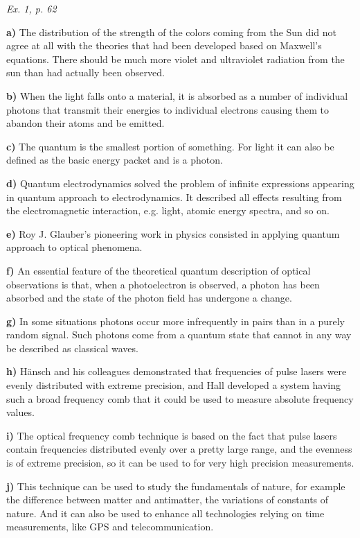\documentclass[a4paper, 12pt]{article}
\def\task#1{\begin{center}\it #1\end{center}}
\newif\ifcols
\begin{document}
\task{Ex. 1, p. 62}
\ifcols\begin{multicols}{2}\fi%

\textbf{a)} The distribution of the strength of the colors coming from the Sun did not agree at all with the theories that had been developed based on Maxwell’s equations. There should be much more violet and ultraviolet radiation from the sun than had actually been observed.

\textbf{b)} When the light falls onto a material, it is absorbed as a number of individual photons that transmit their energies to individual electrons causing them to abandon their atoms and be emitted.

\textbf{c)} The quantum is the smallest portion of something. For light it can also be defined as the basic energy packet and is a photon.

\textbf{d)} Quantum electrodynamics solved the problem of infinite expressions appearing in quantum approach to electrodynamics. It described all effects resulting from the electromagnetic interaction, e.g. light, atomic energy spectra, and so on.

\textbf{e)} Roy J. Glauber's pioneering work in physics consisted in applying quantum approach to optical phenomena.

\textbf{f)} An essential feature of the theoretical quantum description of optical observations is that, when a photoelectron is observed, a photon has been absorbed and the state of the photon field has undergone a change.

\textbf{g)} In some situations photons occur more infrequently in pairs than in a purely random signal. Such photons come from a quantum state that cannot in any way be described as classical waves.

\textbf{h)} H\"ansch and his colleagues demonstrated that frequencies of pulse lasers were evenly distributed with extreme precision, and Hall developed a system having such a broad frequency comb that it could be used to measure absolute frequency values.

\textbf{i)} The optical frequency comb technique is based on the fact that pulse lasers contain frequencies distributed evenly over a pretty large range, and the evenness is of extreme precision, so it can be used to for very high precision measurements.

\textbf{j)} This technique can be used to study the fundamentals of nature, for example the difference between matter and antimatter, the variations of constants of nature. And it can also be used to enhance all technologies relying on time measurements, like GPS and telecommunication.
\ifcols\end{multicols}\fi%
\end{document}
